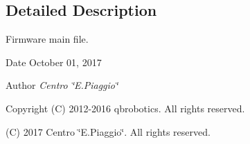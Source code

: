 \subsection{Detailed Description}
Firmware main file. 

\begin{DoxyDate}{Date}
October 01, 2017 
\end{DoxyDate}
\begin{DoxyAuthor}{Author}
{\itshape Centro \char`\"{}\+E.\+Piaggio\char`\"{}} 
\end{DoxyAuthor}
\begin{DoxyCopyright}{Copyright}
(C) 2012-\/2016 qbrobotics. All rights reserved. 

(C) 2017 Centro \char`\"{}\+E.\+Piaggio\char`\"{}. All rights reserved. 
\end{DoxyCopyright}
